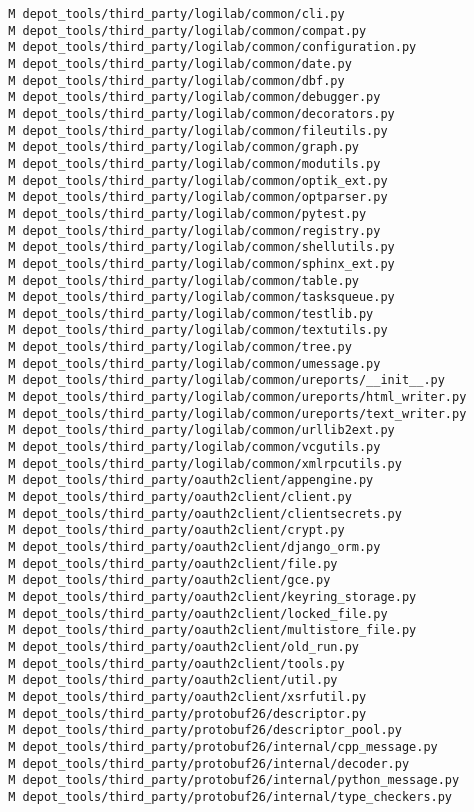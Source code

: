 \documentclass{article}
\begin{document}
\begin{verbatim}
 M depot_tools/third_party/logilab/common/cli.py
 M depot_tools/third_party/logilab/common/compat.py
 M depot_tools/third_party/logilab/common/configuration.py
 M depot_tools/third_party/logilab/common/date.py
 M depot_tools/third_party/logilab/common/dbf.py
 M depot_tools/third_party/logilab/common/debugger.py
 M depot_tools/third_party/logilab/common/decorators.py
 M depot_tools/third_party/logilab/common/fileutils.py
 M depot_tools/third_party/logilab/common/graph.py
 M depot_tools/third_party/logilab/common/modutils.py
 M depot_tools/third_party/logilab/common/optik_ext.py
 M depot_tools/third_party/logilab/common/optparser.py
 M depot_tools/third_party/logilab/common/pytest.py
 M depot_tools/third_party/logilab/common/registry.py
 M depot_tools/third_party/logilab/common/shellutils.py
 M depot_tools/third_party/logilab/common/sphinx_ext.py
 M depot_tools/third_party/logilab/common/table.py
 M depot_tools/third_party/logilab/common/tasksqueue.py
 M depot_tools/third_party/logilab/common/testlib.py
 M depot_tools/third_party/logilab/common/textutils.py
 M depot_tools/third_party/logilab/common/tree.py
 M depot_tools/third_party/logilab/common/umessage.py
 M depot_tools/third_party/logilab/common/ureports/__init__.py
 M depot_tools/third_party/logilab/common/ureports/html_writer.py
 M depot_tools/third_party/logilab/common/ureports/text_writer.py
 M depot_tools/third_party/logilab/common/urllib2ext.py
 M depot_tools/third_party/logilab/common/vcgutils.py
 M depot_tools/third_party/logilab/common/xmlrpcutils.py
 M depot_tools/third_party/oauth2client/appengine.py
 M depot_tools/third_party/oauth2client/client.py
 M depot_tools/third_party/oauth2client/clientsecrets.py
 M depot_tools/third_party/oauth2client/crypt.py
 M depot_tools/third_party/oauth2client/django_orm.py
 M depot_tools/third_party/oauth2client/file.py
 M depot_tools/third_party/oauth2client/gce.py
 M depot_tools/third_party/oauth2client/keyring_storage.py
 M depot_tools/third_party/oauth2client/locked_file.py
 M depot_tools/third_party/oauth2client/multistore_file.py
 M depot_tools/third_party/oauth2client/old_run.py
 M depot_tools/third_party/oauth2client/tools.py
 M depot_tools/third_party/oauth2client/util.py
 M depot_tools/third_party/oauth2client/xsrfutil.py
 M depot_tools/third_party/protobuf26/descriptor.py
 M depot_tools/third_party/protobuf26/descriptor_pool.py
 M depot_tools/third_party/protobuf26/internal/cpp_message.py
 M depot_tools/third_party/protobuf26/internal/decoder.py
 M depot_tools/third_party/protobuf26/internal/python_message.py
 M depot_tools/third_party/protobuf26/internal/type_checkers.py

\end{verbatim}
\end{document}
